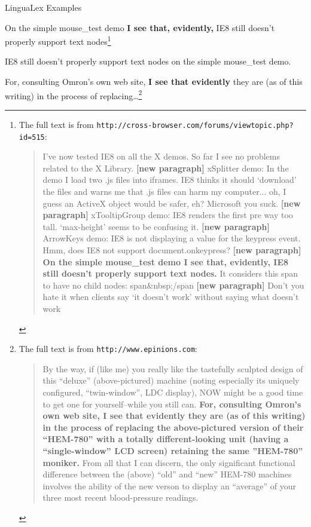 \documentclass{article}
\begin{document}
\begin{exe} 
\ex LinguaLex Examples
\begin{xlist}
\ex On the simple mouse\_test demo {\bf I see that, evidently,} IE8 still doesn't properly support text nodes\footnote{The full text is from \texttt{http://cross-browser.com/forums/viewtopic.php?id=515}: \begin{quote}I've now tested IE8 on all the X demos. So far I see no problems related to the X Library. {\bf [new paragraph]} xSplitter demo: In the demo I load two .js files into iframes. IE8 thinks it should `download' the files and warns me that .js files can harm my computer... oh, I guess an ActiveX object would be safer, eh? Microsoft you suck. {\bf [new paragraph]} xTooltipGroup demo: IE8 renders the first pre way too tall. `max-height' seems to be confusing it. {\bf [new paragraph]} ArrowKeys demo: IE8 is not displaying a value for the keypress event. Hmm, does IE8 not support document.onkeypress? {\bf [new paragraph]} \textbf{On the simple mouse\_test demo I see that, evidently, IE8 still doesn't properly support text nodes.} It considers this span to have no child nodes: span\&nbsp;/span {\bf [new paragraph]} Don't you hate it when clients say `it doesn't work' without saying what doesn't work\end{quote}}\label{onfocevd}
\begin{xlist}
 IE8 still doesn't properly support text nodes on the simple mouse\_test demo.
\end{xlist}
\ex For, consulting Omron's own web site, {\bf I see that evidently} they are (as of this writing) in the process of replacing\ldots\footnote{The full text is from \texttt{http://www.epinions.com}: \begin{quote} By the way, if (like me) you really like the tastefully sculpted design of this ``deluxe'' (above-pictured) machine (noting especially its uniquely configured, ``twin-window'', LDC display), NOW might be a good time to get one for yourself--while you still can. {\bf For, consulting Omron's own web site, I see that evidently they are (as of this writing) in the process of replacing the above-pictured version of their ``HEM-780'' with a totally different-looking unit (having a ``single-window'' LCD screen) retaining the same ''HEM-780'' moniker.} From all that I can discern, the only significant functional difference between the (above) ``old'' and ``new'' HEM-780 machines involves the ability of the new verson to display an ``average'' of your three most recent blood-pressure readings. \end{quote}}\label{fortopevd}

\end{xlist}
\end{exe}
\end{document}

